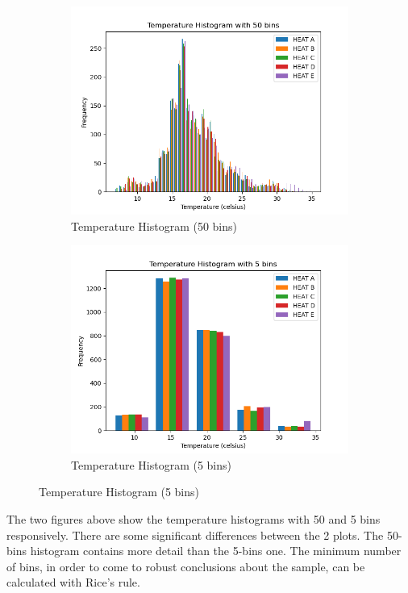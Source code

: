 \documentclass[a4paper,12pt]{article} %
\begin{document}
\begin{figure}[H] %
	\centering %
	\begin{subfigure}[b]{0.4\linewidth}
		\includegraphics[width=0.9\linewidth]{Figure_1.png} 
		\caption{Temperature Histogram (50 bins)}
		\end{subfigure}
	\begin{subfigure}[b]{0.4\linewidth}
		\includegraphics[width=0.9\linewidth]{Figure_2.png} 
		\caption{Temperature Histogram (5 bins)}
	\end{subfigure}
\end{figure}

The two figures above show the temperature histograms with 50 and 5 bins responsively. There are some significant differences between the 2 plots. The 50-bins histogram contains more detail than the 5-bins one. The minimum number of bins, in order to come to robust conclusions about the sample, can be calculated with Rice's rule.
\end{document}
